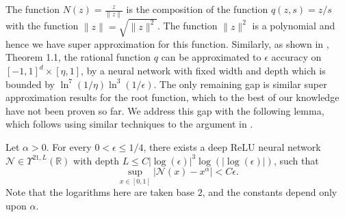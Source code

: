 \documentclass[twoside,11pt]{article}
\begin{document}
The function $N(z)=\frac{z}{\|z\|}$ is the composition of the function $q(z,s)=z/s$ with the function $\|z\|=\sqrt{\|z\|^2} $. The function $\|z\|^2$ is a polynomial and hence we have super approximation for this function. Similarly, as shown in \cite{telgarsky_rational}, Theorem 1.1, 
the rational function $q$ can be approximated to $\epsilon$ accuracy on $[-1,1]^d\times [\eta,1] $, by a neural network with fixed width and depth which is bounded by $\ln^7(1/\eta) \ln^3(1/\epsilon) $. The only remaining gap is similar super approximation results for the root function, which to the best of our knowledge have not been proven so far. We address this gap with the following lemma, which follows using similar techniques to the argument in \cite{telgarsky_rational}.
\begin{lem}\label{power-lemma}
	Let $\alpha > 0$. For every $0 < \epsilon \leq 1/4$, there exists a deep ReLU neural network $\mathcal{N}\in \Upsilon^{21,L}(\mathbb{R})$ with depth $L \leq C|\log(\epsilon)|^3\log(|\log(\epsilon)|)$, such that
	\begin{equation}
		\sup_{x\in [0,1]}|\mathcal{N}(x) - x^\alpha| < C\epsilon.
	\end{equation}
    Note that the logarithms here are taken base $2$, and the constants depend only upon $\alpha$.
\end{lem}
\end{document}
